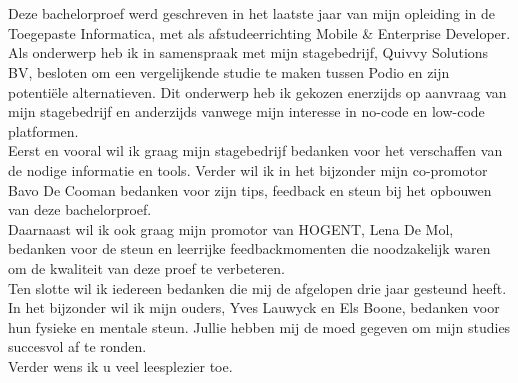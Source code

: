
\chapter*{}%
\label{ch:voorwoord}


Deze bachelorproef werd geschreven in het laatste jaar van mijn opleiding in de Toegepaste Informatica, met als afstudeerrichting Mobile \& Enterprise Developer. \\

Als onderwerp heb ik in samenspraak met mijn stagebedrijf, Quivvy Solutions BV, besloten om een vergelijkende studie te maken tussen Podio en zijn potentiële alternatieven. Dit onderwerp heb ik gekozen enerzijds op aanvraag van mijn stagebedrijf en anderzijds vanwege mijn interesse in no-code en low-code platformen. \\

Eerst en vooral wil ik graag mijn stagebedrijf bedanken voor het verschaffen van de nodige informatie en tools. Verder wil ik in het bijzonder mijn co-promotor Bavo De Cooman bedanken voor zijn tips, feedback en steun bij het opbouwen van deze bachelorproef. \\

Daarnaast wil ik ook graag mijn promotor van HOGENT, Lena De Mol, bedanken voor de steun en leerrijke feedbackmomenten die noodzakelijk waren om de kwaliteit van deze proef te verbeteren. \\

Ten slotte wil ik iedereen bedanken die mij de afgelopen drie jaar gesteund heeft. In het bijzonder wil ik mijn ouders, Yves Lauwyck en Els Boone, bedanken voor hun fysieke en mentale steun. Jullie hebben mij de moed gegeven om mijn studies succesvol af te ronden. \\

Verder wens ik u veel leesplezier toe. \\